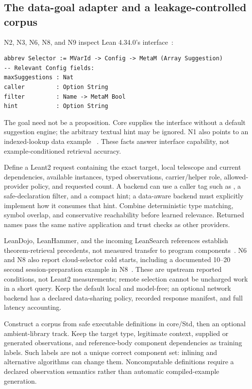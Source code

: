 \subsection{The data-goal adapter and a leakage-controlled corpus}\label{sec:retrieval-corpus}

N2, N3, N6, N8, and N9 inspect Lean 4.34.0's  interface~\cite{leanlibrary}:
\begin{lstlisting}
abbrev Selector := MVarId -> Config -> MetaM (Array Suggestion)
-- Relevant Config fields:
maxSuggestions : Nat
caller         : Option String
filter         : Name -> MetaM Bool
hint           : Option String
\end{lstlisting}
The goal need not be a proposition. Core supplies the interface without a default suggestion engine; the arbitrary textual hint may be ignored. N1 also points to an indexed-lookup data example ~\cite{librarysearch}. These facts answer interface capability, not example-conditioned retrieval accuracy.

Define a Leant2 request containing the exact target, local telescope and current dependencies, available instances, typed observations, carrier/helper role, allowed-provider policy, and requested count. A backend can use a caller tag such as , a safe-declaration filter, and a compact hint; a data-aware backend must explicitly implement how it consumes that hint. Combine deterministic type matching, symbol overlap, and conservative reachability before learned relevance. Returned names pass the same native application and trust checks as other providers.

LeanDojo, LeanHammer, and the incoming LeanSearch references establish theorem-retrieval precedents, not measured transfer to program components~\cite{leandojo,leanhammer,leansearch}. N6 and N8 also report cloud-selector cold starts, including a documented 10--20 second session-preparation example in N8~\cite{premisereadme}. These are upstream reported conditions, not Leant2 measurements; remote selection cannot be uncharged work in a short query. Keep the default local and model-free; an optional network backend has a declared data-sharing policy, recorded response manifest, and full latency accounting.

Construct a corpus from safe executable definitions in core/Std, then an optional ambient-library track. Keep the target type, legitimate context, supplied or generated observations, and reference-body component dependencies as training labels. Such labels are not a unique correct component set: inlining and alternative algorithms can change them. Noncomputable definitions require a declared observation semantics rather than automatic compiled-example generation.


